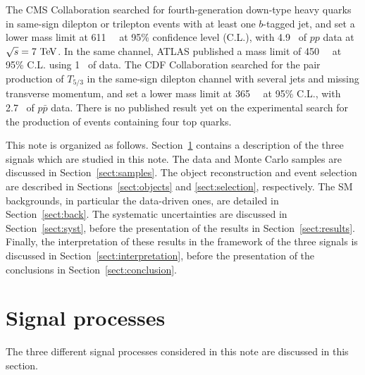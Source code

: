 The CMS Collaboration searched for fourth-generation down-type heavy quarks in same-sign dilepton
or trilepton events with at least one $b$-tagged jet, and set a lower mass limit at 
611~\GeV{}~\cite{Chatrchyan:2012yea} at 95\% confidence level (C.L.), 
with 4.9~\ifb{} of $pp$ data at $\sqrt{s}=7 \TeV$.
In the same channel, ATLAS published a mass limit of 450~\GeV{}~\cite{Aad:2012bb} at 95\% C.L.
using 1~\ifb{} of data.
The CDF Collaboration searched for the pair production of $T_{5/3}$ in the same-sign dilepton
channel with several jets and missing transverse momentum, and set a lower mass limit at
365~\GeV{}~\cite{Aaltonen:2009nr} at 95\% C.L., with 2.7~\ifb{} of $p\bar{p}$ data.
There is no published result yet on the experimental search for the production 
of events containing four top quarks.

This note is organized as follows. Section~\ref{sect:models} contains a description of the
three signals which are studied in this note. The data and Monte Carlo samples are discussed in
Section~\ref{sect:samples}. The object reconstruction and event selection are described in 
Sections~\ref{sect:objects} and \ref{sect:selection}, respectively. The SM backgrounds,
in particular the data-driven ones, are detailed in Section~\ref{sect:back}. The systematic
uncertainties are discussed in Section~\ref{sect:syst}, before the presentation of the results
in Section~\ref{sect:results}. Finally, the interpretation of these results in the framework of the
three signals is discussed in Section~\ref{sect:interpretation}, before the presentation of the
conclusions in Section~\ref{sect:conclusion}.

\section{Signal processes}\label{sect:models}
The three different signal processes considered in this note are discussed in this section.

